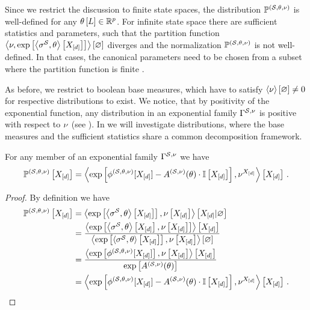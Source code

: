 Since we restrict the discussion to finite state spaces, the distribution $\mathbb{P}^{(\mathcal{S},\theta,\nu)}$ is well-defined for any $\theta\left[L\right]\in\mathbb{R}^{p}$.
For infinite state space there are sufficient statistics and parameters, such that the partition function $\left\langle \nu,\mathrm{exp}\left[\left\langle \sigma^{\mathcal{S}},\theta\right\rangle \left[ X_{[d]} \right]\right]\right\rangle \left[ \varnothing \right]$ diverges and the normalization $\mathbb{P}^{(\mathcal{S},\theta,\nu)}$ is not well-defined.
In that cases, the canonical parameters need to be chosen from a subset where the partition function is finite \cite{wainwright_graphical_2008}.

As before, we restrict to boolean base measures, which have to satisfy $\left\langle \nu\right\rangle \left[ \varnothing \right]\neq0$ for respective distributions to exist.
We notice, that by positivity of the exponential function, any distribution in an exponential family $\Gamma^{\mathcal{S},\nu}$ is positive with respect to $\nu$ (see ).
In  we will investigate distributions, where the base measures and the sufficient statistics share a common decomposition framework.

\begin{lemma}
    \label{lem:energyCumulantRepresentation}
    For any member of an exponential family $\Gamma^{\mathcal{S},\nu}$ we have
    \begin{align*}
        \mathbb{P}^{(\mathcal{S},\theta,\nu)}\left[X_{[d]}\right]
        = \left\langle \mathrm{exp}\left[ \phi^{(\mathcal{S},\theta,\nu)}[X_{[d]}] - A^{(\mathcal{S},\nu)}(\theta)\cdot \mathbb{I}\left[X_{[d]}\right]\right],\nu^{X_{[d]}}\right\rangle \left[ X_{[d]} \right] \, .
    \end{align*}
\end{lemma}
\begin{proof}
    By definition we have
    \begin{align*}
        \mathbb{P}^{(\mathcal{S},\theta,\nu)}\left[X_{[d]}\right]
        &= \left\langle 
            \mathrm{exp}\left[\left\langle \sigma^{\mathcal{S}},\theta\right\rangle \left[ X_{[d]} \right]\right],\nu\left[X_{[d]}\right]
        \right\rangle \left[ X_{[d]} | \varnothing \right] \\
        &= \frac{\left\langle \mathrm{exp}\left[\left\langle \sigma^{\mathcal{S}},\theta\right\rangle \left[ X_{[d]} \right],\nu\left[X_{[d]}\right]\right]\right\rangle \left[ X_{[d]} \right]
        }{\left\langle \mathrm{exp}\left[\left\langle \sigma^{\mathcal{S}},\theta    \right\rangle \left[ X_{[d]} \right]\right],\nu\left[X_{[d]}\right]\right\rangle \left[ \varnothing \right]} \\
        &=  \frac{
            \left\langle \mathrm{exp}\left[\phi^{(\mathcal{S},\theta,\nu)}[X_{[d]}]\right],\nu\left[X_{[d]}\right]\right\rangle \left[ X_{[d]} \right]
        }{
            \mathrm{exp}\left[A^{(\mathcal{S},\nu)}(\theta)\right]
        } \\
        & = \left\langle \mathrm{exp}\left[ \phi^{(\mathcal{S},\theta,\nu)}[X_{[d]}] - A^{(\mathcal{S},\nu)}(\theta)\cdot \mathbb{I}\left[X_{[d]}\right]\right],\nu^{X_{[d]}}\right\rangle \left[ X_{[d]} \right] \, .
    \end{align*}
\end{proof}


